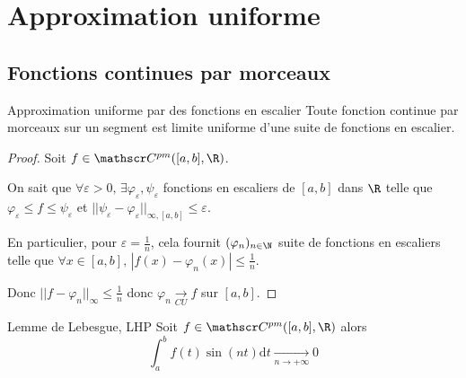 
\section{Approximation uniforme }
\subsection{Fonctions continues par morceaux }

\begin{theorement}{Approximation uniforme par des fonctions en escalier}{}
    Toute fonction continue par morceaux sur un segment est limite uniforme d'une suite 
    de fonctions en escalier. 
\end{theorement}

\begin{proof}
    Soit $f \in \mathscr C^{pm}([a, b], \R)$. 

    On sait que $\forall \varepsilon > 0, \, \exists \varphi_\varepsilon, \psi_\varepsilon$ fonctions en escaliers 
    de $[a, b]$ dans $\R$ telle que $\varphi_\varepsilon \leqslant f \leqslant \psi_\varepsilon$ et
    $||\psi_\varepsilon - \varphi_\varepsilon||_{\infty, [a, b]} \leqslant \varepsilon$.

    En particulier, pour $\varepsilon = \frac 1 n$, cela fournit $(\varphi_n)_{n \in \N}$ suite de 
    fonctions en escaliers telle que $\forall x \in [a, b], \, | f(x) - \varphi_n(x) | \leqslant \frac 1 n$.

    Donc $||f - \varphi_n||_\infty \leqslant \frac 1 n $ donc $\varphi_n \xrightarrow[CU]{} f$ sur $[a, b]$.
\end{proof}


\begin{proposition}{Lemme de Lebesgue, LHP}{}
    Soit $f \in \mathscr C^{pm}([a, b], \R)$ alors \[\int_a^b f(t) \sin(nt) \mathrm d t \xrightarrow[n \to + \infty ]{} 0\]
\end{proposition}


